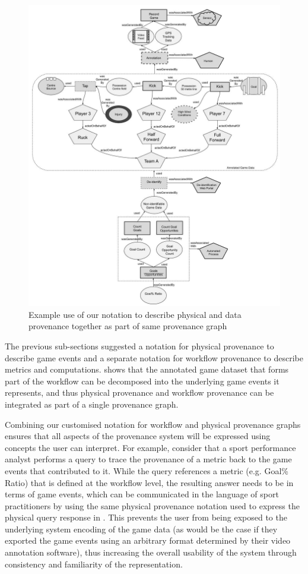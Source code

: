 \begin{figure}[!h]
\includegraphics[width=\linewidth]{figs/paper/image4.jpg}
\caption{Example use of our notation to describe physical and data provenance together as part of same provenance graph}
\label{CombinedProv}
\end{figure}

The previous sub-sections suggested a notation for physical provenance
to describe game events and a separate notation for workflow provenance to
describe metrics and computations.  shows
that the annotated game dataset that forms part of the workflow can be
decomposed into the underlying game events it represents, and thus
physical provenance and workflow provenance can be integrated as part of
a single provenance graph.

Combining our customised notation for workflow and physical provenance
graphs ensures that all aspects of the provenance system will be
expressed using concepts the user can interpret. For example, consider
that a sport performance analyst performs a query to trace the
provenance of a metric back to the game events that contributed to it.
While the query references a metric (e.g. Goal\% Ratio) that is defined
at the workflow level, the resulting answer needs to be in terms of game
events, which can be communicated in the language of sport practitioners
by using the same physical provenance notation used to express the
physical query response in . This prevents the
user from being exposed to the underlying system encoding of the game
data (as would be the case if they exported the game events using an
arbitrary format determined by their video annotation software), thus
increasing the overall usability of the system through consistency and
familiarity of the representation.

